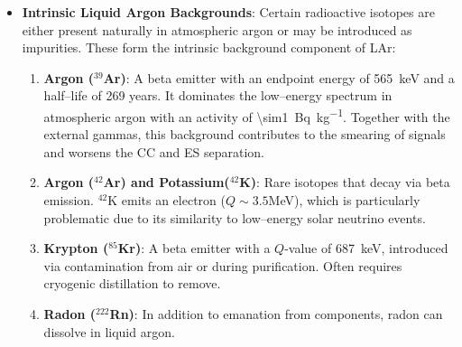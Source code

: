\begin{itemize}
        \begin{enumerate}
          \item \textbf{Uranium (\(^{238}\)U)}: Produces alpha, beta, and gamma emissions, as well as daughters like \(^{214}\)Bi and \(^{210}\)Pb.
          \item \textbf{Thorium (\(^{232}\)Th)}: Similar to the uranium chain, with prominent gamma emitters like \(^{208}\)Tl (\SI{2.6}{\mega\electronvolt}).
          \item \textbf{Potassium (\(^{40}\)K)}: Often present in glass, \ac{PMT}s, and plastics; emits a 1.46~MeV gamma ray.
          \item \textbf{Radon (\(^{222}\)Rn)}: Present in atmospheric air and therefore very difficult to prevent.
        \end{enumerate}

  \item \textbf{Intrinsic Liquid Argon Backgrounds}: Certain radioactive isotopes are either present naturally in atmospheric argon or may be introduced as impurities. These form the intrinsic background component of \ac{LAr}:

        \begin{enumerate}
          \item \textbf{Argon (\(^{39}\)Ar)}: A beta emitter with an endpoint energy of \SI{565}{\kilo\electronvolt} and a half--life of 269 years. It dominates the low--energy spectrum in atmospheric argon with an activity of \SI{\sim1}{\becquerel\per\kilo\gram}. Together with the external gammas, this background contributes to the smearing of signals and worsens the \ac{CC} and \ac{ES} separation.
          \item \textbf{Argon (\(^{42}\)Ar) and Potassium(\(^{42}\)K)}: Rare isotopes that decay via beta emission. \(^{42}\)K emits an electron (\(Q \sim 3.5\)\unit{\mega\electronvolt}), which is particularly problematic due to its similarity to low--energy solar neutrino events.
          \item \textbf{Krypton (\(^{85}\)Kr)}: A beta emitter with a \(Q\)-value of \SI{687}{\kilo\electronvolt}, introduced via contamination from air or during purification. Often requires cryogenic distillation to remove.
          \item \textbf{Radon (\(^{222}\)Rn)}: In addition to emanation from components, radon can dissolve in liquid argon.
        \end{enumerate}
\end{itemize}

